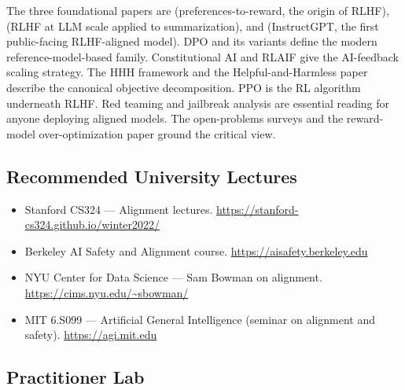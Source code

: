 The three foundational papers are \citet{christiano2017deep}
(preferences-to-reward, the origin of RLHF),
\citet{stiennon2020learning} (RLHF at LLM scale applied to
summarization), and \citet{ouyang2022training} (InstructGPT, the
first public-facing RLHF-aligned model). DPO \citep{rafailov2023direct}
and its variants \citep{azar2023general, ethayarajh2024kto,
hong2024orpo, meng2024simpo} define the modern
reference-model-based family. Constitutional AI
\citep{bai2022constitutional} and RLAIF \citep{lee2023rlaif} give
the AI-feedback scaling strategy. The HHH framework
\citep{askell2021general} and the Helpful-and-Harmless paper
\citep{bai2022training} describe the canonical objective
decomposition. PPO \citep{schulman2017ppo} is the RL algorithm
underneath RLHF. Red teaming \citep{ganguli2022redteaming,
perez2022redteaming} and jailbreak analysis
\citep{wei2023jailbroken, zou2023universal} are essential reading
for anyone deploying aligned models. The open-problems surveys
\citep{casper2023open, anwar2024foundational} and the reward-model
over-optimization paper \citep{gao2023scaling} ground the critical
view.

\subsection{Recommended University Lectures}

\begin{itemize}
  \item Stanford CS324 --- Alignment lectures.
        \url{https://stanford-cs324.github.io/winter2022/}
  \item Berkeley AI Safety and Alignment course.
        \url{https://aisafety.berkeley.edu}
  \item NYU Center for Data Science --- Sam Bowman on alignment.
        \url{https://cims.nyu.edu/~sbowman/}
  \item MIT 6.S099 --- Artificial General Intelligence (seminar on
        alignment and safety).  \url{https://agi.mit.edu}
\end{itemize}

\subsection{Practitioner Lab}

